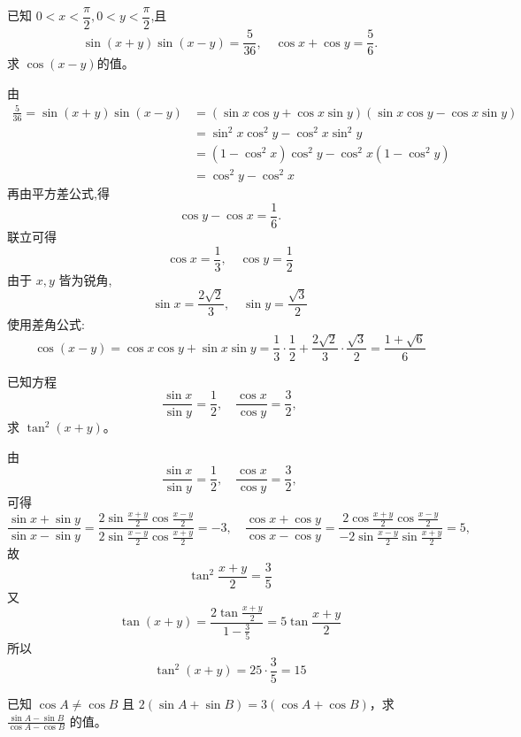\begin{questions}
    \question 已知 $0<x<\dfrac{\pi}{2},0<y<\dfrac{\pi}{2}$,且
    \[
    \sin(x+y)\sin(x-y)=\frac{5}{36}, \quad \cos x+\cos y=\frac{5}{6}.
    \]
    求 $\cos(x-y)$的值。
    \begin{solution}
        由
        \begin{align*}
        \frac{5}{36}=\sin(x+y)\sin(x-y) &= (\sin x\cos y + \cos x \sin y)(\sin x\cos y - \cos x \sin y) \\
        &= \sin^2 x \cos^2 y - \cos^2 x \sin^2 y \\
        &= (1-\cos^2 x)\cos^2 y - \cos^2 x (1-\cos^2 y) \\
        &= \cos^2 y - \cos^2 x 
        \end{align*}
        再由平方差公式,得
        \[
        \cos y - \cos x = \frac{1}{6}.
        \]
        联立可得
        \[
        \cos x = \frac{1}{3}, \quad \cos y = \frac{1}{2}
        \]
        由于 $x, y$ 皆为锐角,
        \[
        \sin x = \frac{2\sqrt{2}}{3}, \quad \sin y = \frac{\sqrt{3}}{2}
        \]
        使用差角公式:
        \[
        \cos(x-y) = \cos x \cos y + \sin x \sin y = \frac{1}{3}\cdot \frac{1}{2} + \frac{2\sqrt{2}}{3} \cdot \frac{\sqrt{3}}{2} = \frac{1+\sqrt{6}}{6}
        \]
    \end{solution}

    \question 已知方程
    \[
    \frac{\sin x}{\sin y} = \frac{1}{2}, \quad 
    \frac{\cos x}{\cos y} = \frac{3}{2},
    \]
    求 $\tan^2(x+y)$。
    \begin{solution}
        由
        \[
        \frac{\sin x}{\sin y} = \frac{1}{2}, \quad 
        \frac{\cos x}{\cos y} = \frac{3}{2},
        \]
        可得
        \[
        \frac{\sin x + \sin y}{\sin x - \sin y }=\frac{2\sin \frac{x+y}{2}\cos \frac{x-y}{2}}{2\sin \frac{x-y}{2}\cos \frac{x+y}{2}}=-3,\quad \frac{\cos x + \cos y}{\cos x - \cos y }=\frac{2\cos \frac{x+y}{2}\cos \frac{x-y}{2}}{-2\sin \frac{x-y}{2}\sin \frac{x+y}{2}}=5 ,
        \]
        故
        \[
        \tan^2 \frac{x+y}{2}=\frac{3}{5}
        \]
        又
        \[
        \tan (x+y)=\frac{2\tan \frac{x+y}{2}}{1-\frac{3}{5}}=5\tan\frac{x+y}{2}
        \]
        所以
        \[
        \tan^2 (x+y)=25\cdot \frac{3}{5}=15
        \]
    \end{solution}

    \question 已知 $\cos A \neq \cos B$ 且 $2(\sin A + \sin B) = 3(\cos A + \cos B)$，求 $\frac{\sin A - \sin B}{\cos A - \cos B}$ 的值。


\end{questions}
